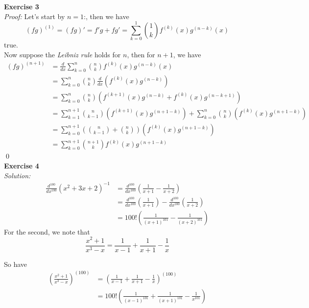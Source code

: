 \documentclass[12pt]{article}
\begin{document}
{\bf Exercise 3}\\
{\it Proof:}
Let's start by $n=1$:, then we have
\[
(fg)^{(1)}=(fg)'=f'g+fg'=\sum_{k=0}^{1}{1 \choose k}f^{(k)}(x)g^{(n-k)}(x)
\]
true. \\
Now suppose the {\it Leibniz rule} holds for $n$, then for $n+1$, we have\\
\begin{align*}
(fg)^{(n+1)}&=\frac{d}{dx}\sum_{k=0}^{n}{n \choose k}f^{(k)}(x)g^{(n-k)}(x)\\
&=\sum_{k=0}^{n}{n \choose k}\frac{d}{dx}\left(f^{(k)}(x)g^{(n-k)}\right)\\
&=\sum_{k=0}^{n}{n \choose k}\left(f^{(k+1)}(x)g^{(n-k)}+f^{(k)}(x)g^{(n-k+1)}\right)\\
&=\sum_{k=1}^{n+1}{n \choose k-1}\left(f^{(k+1)}(x)g^{(n+1-k)}\right)+
\sum_{k=0}^{n}{n \choose k}\left(f^{(k)}(x)g^{(n+1-k)}\right)\\
&=\sum_{k=0}^{n+1}\left({n \choose k-1}+{n \choose k}\right)\left(f^{(k)}(x)g^{(n+1-k)}\right)\\
&=\sum_{k=0}^{n+1}{n+1 \choose k}f^{(k)}(x)g^{(n+1-k)}
\end{align*}\qed\\
{\bf Exercise 4}\\
{\it Solution:}
\begin{align*}
\frac{d^{100}}{dx^{100}}{(x^2+3x+2)}^{-1}&=\frac{d^{100}}{dx^{100}}\left(\frac{1}{x+1}-\frac{1}{x+2}\right)\\
&=\frac{d^{100}}{dx^{100}}\left(\frac{1}{x+1}\right)-\frac{d^{100}}{dx^{100}}\left(\frac{1}{x+2}\right)\\
&=100!\left(\frac{1}{{(x+1)}^{101}}-\frac{1}{{(x+2)}^{101}}\right)
\end{align*}
For the second, we note that
\[
\frac{x^2+1}{x^3-x}=\frac{1}{x-1}+\frac{1}{x+1}-\frac{1}{x}
\]

So have
\begin{align*}
{\left(\frac{x^2+1}{x^3-x}\right)}^{(100)}&={\left(\frac{1}{x-1}+\frac{1}{x+1}-\frac{1}{x}\right)}^{(100)}\\
&=100!\left(\frac{1}{(x-1)^{101}}+\frac{1}{(x+1)^{101}}-\frac{1}{x^{101}}\right)
\end{align*}\\
\end{document}
